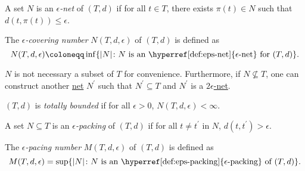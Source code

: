 \begin{definition}\label{def:eps-net}
	A set \(N\) is an \emph{\(\epsilon \)-net} of \((T, d)\) if for all \(t\in T\), there exists \(\pi (t) \in N\) such that \(d(t, \pi (t)) \leq \epsilon \).
\end{definition}

\begin{definition}\label{def:covering-number}
	The \emph{\(\epsilon \)-covering number} \(N(T, d, \epsilon )\) of \((T, d)\) is defined as
	\[
		N(T, d, \epsilon ) \coloneqq \inf \{ \vert N \vert \colon N \text{ is an \hyperref[def:eps-net]{\(\epsilon\)-net} for \((T, d)\)} \}.
	\]
\end{definition}

\begin{remark}
	\(N\) is not necessary a subset of \(T\) for convenience. Furthermore, if \(N \nsubseteq T\), one can construct another \hyperref[def:eps-net]{net} \(N^{\prime} \) such that \(N^{\prime} \subseteq T\) and \(N^{\prime} \) is a \hyperref[def:eps-net]{\(2 \epsilon\)-net}.
\end{remark}

\begin{definition}\label{def:totally-bounded}
	\((T, d)\) is \emph{totally bounded} if for all \(\epsilon > 0\), \(N(T, d, \epsilon ) < \infty \).
\end{definition}

\begin{definition}\label{def:eps-packing}
	A set \(N \subseteq T\) is an \emph{\(\epsilon \)-packing} of \((T, d)\) if for all \(t \neq t^{\prime} \) in \(N\), \(d(t, t^{\prime} ) > \epsilon \).
\end{definition}

\begin{definition}\label{def:packing-number}
	The \emph{\(\epsilon \)-pacing number} \(M(T, d, \epsilon )\) of \((T, d)\) is defined as
	\[
		M(T, d, \epsilon ) = \sup \{ \vert N \vert \colon N \text{ is an \hyperref[def:eps-packing]{\(\epsilon\)-packing} of \((T, d)\)}\}.
	\]
\end{definition}

